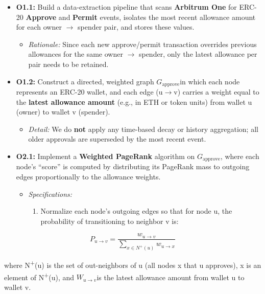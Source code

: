 \begin{itemize}
\item[\textbullet] \textbf{O1.1: }Build a data-extraction pipeline that scans \textbf{Arbitrum One} for ERC-20 \textbf{Approve }and \textbf{Permit }events, isolates the most recent allowance amount for each owner \(\to\) spender pair, and stores these values.
\begin{itemize}
\item[\textendash] \emph{Rationale: }Since each new approve/permit transaction overrides previous allowances for the same owner \(\to\) spender, only the latest allowance per pair needs to be retained.
\end{itemize}
\item[\textbullet] \textbf{O1.2: }Construct a directed, weighted graph $G_{\text{approve}}$in which each node represents an ERC-20 wallet, and each edge (u\(\to\)v) carries a weight equal to the \textbf{latest allowance amount }(e.g., in ETH or token units) from wallet u (owner) to wallet v (spender).
\begin{itemize}
\item[\textendash] \emph{Detail: }We do \textbf{not }apply any time-based decay or history aggregation; all older approvals are superseded by the most recent event.
\end{itemize}
\end{itemize}

\begin{itemize}
\item[\textbullet] \textbf{O2.1: }Implement a \textbf{Weighted PageRank }algorithm on $G_{\text{approve}}$, where each node's ``score'' is computed by distributing its PageRank mass to outgoing edges proportionally to the allowance weights.
\begin{itemize}
\item[\textendash] \emph{Specifications:}
\begin{enumerate}
\item[(a)] Normalize each node's outgoing edges so that for node u, the probability of transitioning to neighbor v is:
\end{enumerate}
\end{itemize}
\end{itemize}
\[P_{u\to v} = \frac{w_{u\to v}}{\sum _{x\in N^{+}(u)}w_{u\to x}}\]

where N\textsuperscript{+}(u) is the set of out-neighbors of u (all nodes x that u approves), x is an element of N\textsuperscript{+}(u), and $W_{u\to v}$is the latest allowance amount from wallet u to wallet v.


